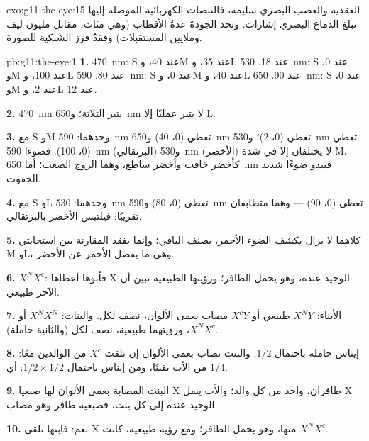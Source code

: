\begin{solution}{exo:g11:the-eye:15}
 العقدية والعصب البصري سليمة، فالنبضات الكهربائية الموصلة إليها
تبلغ الدماغ البصري إشارات. وتحد الجودةَ عدةُ الأقطاب (وهي مئات، مقابل
مليون ليف وملايين المستقبلات) وفقدُ فرز الشبكية للصورة.
\end{solution}

\begin{solution}{pb:g11:the-eye:1}
\textbf{1.} \qty{470}{nm}: S عند 40، وM عند 35، وL عند 18.
\qty{530}{nm}: S عند 0، وM عند 100، وL عند 80. \qty{590}{nm}: S عند 0،
وM عند 40، وL عند 90. \qty{650}{nm}: S عند 0، وM عند 2، وL عند 12.

\textbf{2.} \qty{470}{nm} يثير الثلاثة؛ و\qty{650}{nm} لا يثير عمليًا
إلا L.

\textbf{3.} مع S وM وحدهما: \qty{590}{nm} تعطي (0، 40) و\qty{650}{nm}
تعطي (0، 2)؛ و\qty{530}{nm} تعطي (0، 100). فضوءا \qty{590}{nm}
(البرتقالي) و\qty{530}{nm} (الأخضر) لا يختلفان إلا في شدة M، كأخضر
خافت وأخضر ساطع، وهما الزوج الصعب؛ أما \qty{650}{nm} فيبدو ضوءًا
شديد الخفوت.

\textbf{4.} مع S وL وحدهما: \qty{530}{nm} تعطي (0، 80) و\qty{590}{nm}
تعطي (0، 90) --- وهما متطابقان تقريبًا: فيلتبس الأخضر بالبرتقالي.

\textbf{5.} كلاهما لا يزال يكشف الضوء الأحمر، بصنف  الباقي؛
وإنما يفقد المقارنة بين استجابتي M وL، وهي ما يفصل الأحمر عن الأخضر.

\textbf{6.} $X^NX^c$: فأبوها أعطاها  X الوحيد عنده، وهو يحمل
 الطافر؛ ورؤيتها الطبيعية تبين أن  الآخر طبيعي.

\textbf{7.} الأبناء: $X^NY$ طبيعي أو $X^cY$ مصاب بعمى الألوان، نصف
لكل. والبنات: $X^NX^N$ أو $X^NX^c$، ورؤيتهما طبيعية، نصف لكل
(والثانية حاملة).

\textbf{8.} إيناس حاملة باحتمال $1/2$. والبنت تصاب بعمى الألوان إن
تلقت $X^c$ من الوالدين معًا: من الأب يقينًا، ومن إيناس باحتمال
$1/2 \times 1/2$: أي $1/4$.

\textbf{9.} البنت المصابة بعمى الألوان لها صبغيا X طافران، واحد من كل
والد؛ والأب ينقل  X الوحيد عنده إلى كل بنت، فصبغيه طافر وهو مصاب.

\textbf{10.} نعم: فابنها تلقى  X منها، وهو يحمل  الطافر؛ ومع
رؤية طبيعية، كانت $X^NX^c$.


\end{solution}
